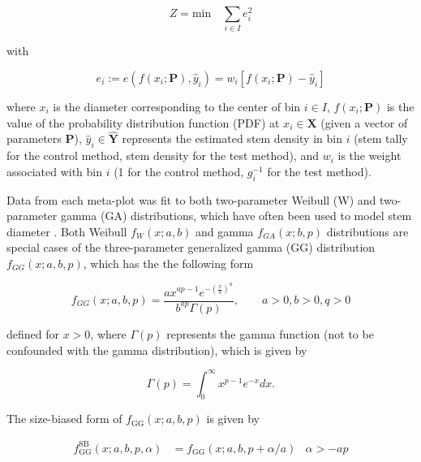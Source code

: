 \message{ !name(hpsdistfit_article.tex)}\documentclass{article}
\begin{document}
\begin{equation*}
Z = \text{min} \quad \sum_{i \in I} e_i^2
\end{equation*}

    with

   \begin{equation*}
    e_i := e\left(f(x_i; \bm{P}), \hat{y}_i\right) = w_i \left[f(x_i; \bm{P}) - \hat{y}_i\right] 
  \end{equation*}
  
  where $x_i$ is the diameter corresponding to the center of bin $i
  \in I$, $f(x_i; \bm{P})$ is the value of the probability
  distribution function (PDF) at $x_i \in \bm{X}$ (given a vector of
  parameters $\bm{P}$), $\hat{y}_i \in \bm{\hat{Y}}$ represents the
  estimated stem density in bin $i$ (stem tally for the control method, stem density for the test method), and $w_i$ is the weight associated with bin $i$ (1 for the control method, $g_i^{-1}$ for the test method).

Data from each meta-plot was fit to both two-parameter Weibull (W) and
two-parameter gamma (GA) distributions, which have often been used to model stem diameter \citep{bailey1973quantifying, cao2004predicting, ducey2015sizebiased, zutter1986characterizing, hafley1977statistical}.
Both Weibull $f_W(x; a, b)$ and gamma $f_{GA}(x; b, p)$ distributions are
special cases of the three-parameter generalized gamma (GG)
distribution  $f_{GG}(x; a, b, p)$, which has the the following form

\begin{equation*}
f_{GG}(x; a, b, p) = \frac{ax^{ap-1}e^{-\left(\frac{x}{b}\right)^a}}{b^{ap}\Gamma(p)}, \qquad a > 0, b > 0, q > 0
\end{equation*}

defined for $x > 0$, where $\Gamma(p)$ represents the gamma function (not to be confounded with the gamma distribution), which is given by

\begin{equation*}
\Gamma(p) = \int_0^\infty x^{p-1}e^{-x} dx.
\end{equation*}


The size-biased form of $f_{\text{GG}}(x; a, b, p)$ is given by 

\begin{align}
f^{\text{SB}}_{\text{GG}}(x; a, b, p, \alpha) &= f_{\text{GG}}(x;
                                                    a, b, p +
                                                    \alpha/a) & \alpha
                                                                > -ap
\end{align}
\end{document}
